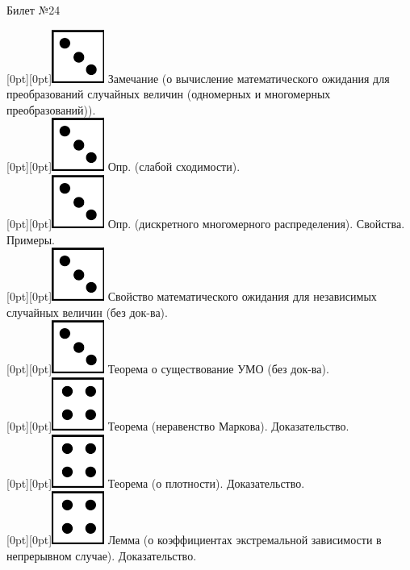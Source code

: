 \documentclass[10pt]{article}
\begin{document}
\begin{center} {\Large Билет №24} \end{center} 

\raisebox{-1pt}[0pt][0pt]{\includegraphics[width=0.02\linewidth]{3.png}} Замечание (о вычисление  математического ожидания для преобразований случайных величин (одномерных и многомерных преобразований)). \\

\raisebox{-1pt}[0pt][0pt]{\includegraphics[width=0.02\linewidth]{3.png}} Опр. (слабой сходимости). \\

\raisebox{-1pt}[0pt][0pt]{\includegraphics[width=0.02\linewidth]{3.png}} Опр. (дискретного многомерного распределения). Свойства. Примеры. \\

\raisebox{-1pt}[0pt][0pt]{\includegraphics[width=0.02\linewidth]{3.png}} Свойство  математического ожидания для независимых случайных величин (без док-ва). \\

\raisebox{-1pt}[0pt][0pt]{\includegraphics[width=0.02\linewidth]{3.png}} Теорема о существование УМО (без док-ва). \\

\raisebox{-1pt}[0pt][0pt]{\includegraphics[width=0.02\linewidth]{4.png}} Теорема (неравенство Маркова). Доказательство. \\

\raisebox{-1pt}[0pt][0pt]{\includegraphics[width=0.02\linewidth]{4.png}} Теорема (о плотности). Доказательство. \\

\raisebox{-1pt}[0pt][0pt]{\includegraphics[width=0.02\linewidth]{4.png}} Лемма (о коэффициентах экстремальной зависимости в непрерывном случае). Доказательство. \\
\end{document}
